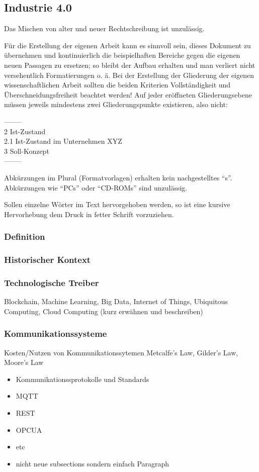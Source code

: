 \subsection{Industrie 4.0}
Das Mischen von alter und neuer Rechtschreibung ist unzulässig.

Für die Erstellung der eigenen Arbeit kann es sinnvoll sein, dieses Dokument zu übernehmen  und kontinuierlich die beispielhaften Bereiche gegen die eigenen neuen Passagen zu ersetzen; so bleibt der Aufbau erhalten und man verliert nicht versehentlich Formatierungen o. ä. Bei der Erstellung der Gliederung der eigenen wissenschaftlichen Arbeit sollten die beiden Kriterien Vollständigkeit und Überschneidungsfreiheit beachtet werden! Auf jeder eröffneten Gliederungsebene müssen jeweils mindestens zwei Gliederungspunkte existieren, also nicht:

\noindent--------\\
2	Ist-Zustand\\
2.1	Ist-Zustand im Unternehmen XYZ\\
3	Soll-Konzept\\
--------

Abkürzungen im Plural (Formatvorlagen) erhalten kein nachgestelltes "`s"'. Abkürzungen wie "`PCs"' oder "`CD-ROMs"' sind unzulässig.

Sollen einzelne Wörter im Text hervorgehoben werden, so ist eine kursive Hervorhebung dem Druck in fetter Schrift  vorzuziehen.

\subsubsection{Definition}
\subsubsection{Historischer Kontext}
\subsubsection{Technologische Treiber}
Blockchain, Machine Learning, Big Data, Internet of Things, Ubiquitous Computing, Cloud Computing (kurz erwähnen und beschreiben)
\subsubsection{Kommunikationssysteme}
Kosten/Nutzen von Kommunikationssytemen
Metcalfe’s Law, Gilder’s Law, Moore’s Law
\begin{itemize}
  \item Kommunikationssprotokolle und Standards
  \item MQTT
  \item REST
  \item OPCUA
  \item etc
  \item nicht neue subsections sondern einfach Paragraph
\end{itemize}
